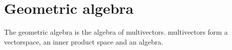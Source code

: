 \section{Geometric algebra}

The geometric algebra is the algebra of multivectors. multivectors form a vectorspace, an inner product space and an algebra. 